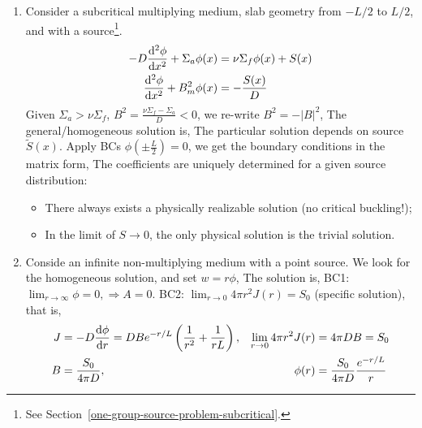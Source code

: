 \documentclass{school-22.211-notes}
\begin{document}
\begin{enumerate}
\begin{enumerate}
  \item Consider a subcritical multiplying medium, slab geometry from $-L/2$ to $L/2$, and with a source\footnote{See Section~\ref{one-group-source-problem-subcritical}.}. 
    \begin{align}
      - D \frac{\mathrm{d}^{2}\phi}{\mathrm{d}x^{2}} + \Sigma_a \phi(x) &= \nu \Sigma_f \phi(x) + S(x) \\
      \frac{\mathrm{d}^{2}\phi}{\mathrm{d}x^{2}} + B_m^2 \phi(x) &= -\frac{S(x)}{D} 
    \end{align}
    Given $\Sigma_a > \nu \Sigma_f$, $B^2 = \frac{\nu \Sigma_f - \Sigma_a}{D} < 0 $, we re-write $B^2 = - |B|^2$,
    The general/homogeneous solution is,
    The particular solution depends on source $\tilde{S}(x)$. Apply BCs $\phi \left( \pm \frac{L}{2} \right) = 0$, we get the boundary conditions in the matrix form,
    The coefficients are uniquely determined for a given source distribution: 
    \begin{itemize}
    \item There always exists a physically realizable solution (no critical buckling!);
    \item In the limit of $S\to 0$, the only physical solution is the trivial solution. 
    \end{itemize}



    \clearpage
  \item Conside an infinite non-multiplying medium with a point source. 
    We look for the homogeneous solution, and set $w = r \phi$, 
    The solution is, 
    BC1: $\lim_{r\to \infty} \phi = 0, \Rightarrow A=0$. BC2: $\lim_{r\to 0} 4 \pi r^2 J(r) = S_0$ (specific solution), that is, 
    \begin{align}
      J &= -D \frac{\mathrm{d}\phi}{\mathrm{d}r} = DBe^{-r/L} \left( \frac{1}{r^2} + \frac{1}{rL} \right), 
      &\lim_{r\to 0} 4 \pi r^2 J(r) &= 4 \pi DB = S_0 \\
      B &= \frac{S_0}{4 \pi D}, & \phi(r) &= \frac{S_0}{4\pi D} \frac{e^{-r/L}}{r} 
    \end{align}


\end{enumerate}
\end{enumerate}
\end{document}
